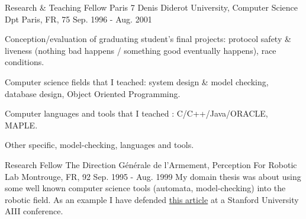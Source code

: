 \begin{cventries}
  \cventry
    {Research \& Teaching Fellow} %
    {Paris 7 Denis Diderot University, Computer Science Dpt} %
    {Paris, FR, 75} %
    {Sep. 1996 - Aug. 2001} %
    {} %
{
      \begin{cvitems} %
        \item {Conception/evaluation of graduating student's final projects: protocol safety \& liveness  (nothing bad happens / something good eventually happens), race conditions.}
        \item {Computer science fields that I teached: system design \& model checking, database design, Object Oriented Programming.}
        \item {Computer languages and tools that I teached : C/C++/Java/ORACLE, MAPLE.}
        \item {Other specific, model-checking, languages and tools.}
      \end{cvitems}
} %

  \cventry
    {Research Fellow} %
    {The Direction Générale de l'Armement, Perception For Robotic Lab} %
    {Montrouge, FR, 92} %
    {Sep. 1995 - Aug. 1999} %
{
My domain thesis was about using some well known computer science tools (automata, model-checking) into the robotic field. As an example I have defended \href{http://www.aaai.org/Papers/Symposia/Spring/1999/SS-99-05/SS99-05-001.pdf}{this article} at a Stanford University AIII conference.
} %
    {} %

\end{cventries}
